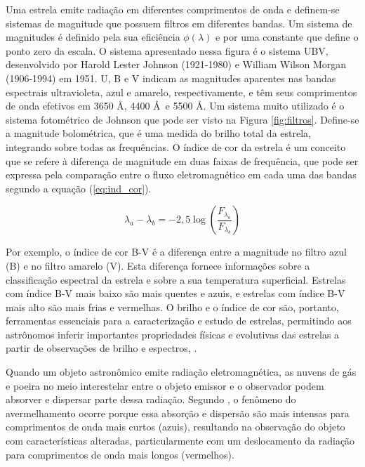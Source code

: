         Uma estrela emite radiação em diferentes comprimentos de onda e definem-se sistemas de magnitude que possuem filtros em diferentes bandas. Um sistema de magnitudes é definido pela sua eficiência \(\phi(\lambda)\) e por uma constante que define o ponto zero da escala. O sistema apresentado nessa figura é o sistema UBV, desenvolvido por Harold Lester Johnson (1921-1980) e William Wilson Morgan (1906-1994) em 1951. U, B e V indicam as magnitudes aparentes nas bandas espectrais ultravioleta, azul e amarelo, respectivamente, e têm seus comprimentos de onda efetivos em 3650 \AA, 4400 \AA \, e 5500 \AA. Um sistema muito utilizado é o sistema fotométrico de Johnson que pode ser visto na Figura \ref{fig:filtros}. Define-se a magnitude bolométrica, que é uma medida do brilho total da estrela, integrando sobre todas as frequências. O índice de cor da estrela é um conceito que se refere à diferença de magnitude em duas faixas de frequência, que pode ser expressa pela comparação entre o fluxo eletromagnético em cada uma das bandas segundo a equação (\ref{eq:ind_cor}).
        
        \begin{equation}\label{eq:ind_cor}
        	\lambda_a-\lambda_b = -2,5\log\left(\frac{F_{\lambda_a}}{F_{\lambda_b}}\right)
        \end{equation}
    
   		Por exemplo, o índice de cor B-V é a diferença entre a magnitude no filtro azul (B) e no filtro amarelo (V). Esta diferença fornece informações sobre a classificação espectral da estrela e sobre a sua temperatura superficial. Estrelas com índice B-V mais baixo são mais quentes e azuis, e estrelas com  índice B-V mais alto são mais frias e vermelhas. O brilho e o índice de cor são, portanto, ferramentas essenciais para a caracterização e estudo de estrelas, permitindo aos astrônomos inferir importantes propriedades físicas e evolutivas  das estrelas a partir de  observações de brilho e espectros, \cite{thanu_2006}.
        
        Quando um objeto astronômico emite radiação eletromagnética, as nuvens de gás e poeira no meio interestelar entre o objeto emissor e o observador podem absorver e dispersar parte dessa radiação. Segundo , o fenômeno do avermelhamento ocorre porque essa absorção e dispersão são mais intensas para comprimentos de onda mais curtos (azuis), resultando na observação do objeto com características alteradas, particularmente com um deslocamento da radiação para comprimentos de onda mais longos (vermelhos).
        

